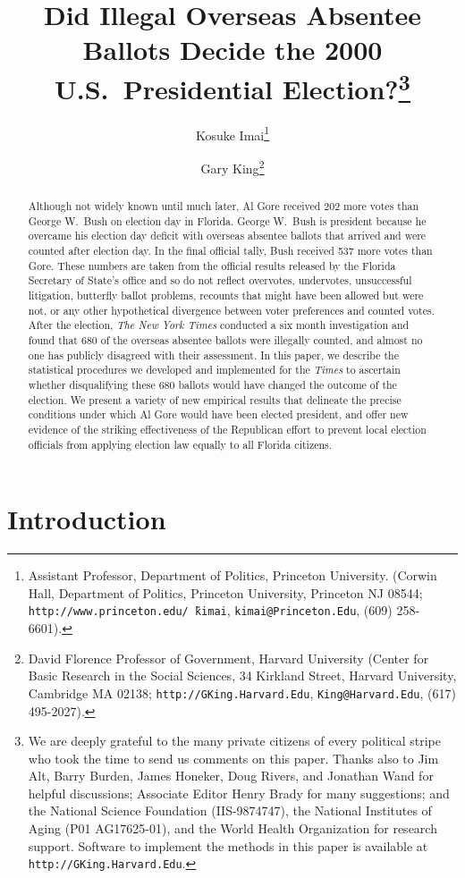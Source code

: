 \documentclass[11pt,titlepage]{article}
\title{Did Illegal Overseas Absentee Ballots Decide the 2000 U.S.\ 
  Presidential Election?\thanks{We are deeply grateful to the many
    private citizens of every political stripe who took the time to
    send us comments on this paper.  Thanks also to Jim Alt, Barry
    Burden, James Honeker, Doug Rivers, and Jonathan Wand for helpful
    discussions; Associate Editor Henry Brady for many suggestions;
    and the National Science Foundation (IIS-9874747), the National
    Institutes of Aging (P01 AG17625-01), and the World Health
    Organization for research support.  Software to implement the
    methods in this paper is available at
    \texttt{http://GKing.Harvard.Edu}.}}
\author{Kosuke Imai\thanks{Assistant Professor, Department of
    Politics, Princeton University. (Corwin Hall, Department of
    Politics, Princeton University, Princeton NJ 08544;
    \texttt{http://www.princeton.edu/\~\,kimai},
    \texttt{kimai@Princeton.Edu}, (609) 258-6601).}
\and %
Gary King\thanks{David Florence Professor of Government, Harvard
  University (Center for Basic Research in the Social Sciences, 34
  Kirkland Street, Harvard University, Cambridge MA 02138;
  \texttt{http://GKing.Harvard.Edu}, \texttt{King@Harvard.Edu}, (617)
  495-2027).}  }
\begin{document}
\maketitle
{}\baselineskip

\begin{abstract}
  Although not widely known until much later, Al Gore received 202
  more votes than George W.\ Bush on election day in Florida.  George
  W.\ Bush is president because he overcame his election day deficit
  with overseas absentee ballots that arrived and were counted after
  election day.  In the final official tally, Bush received 537 more
  votes than Gore.  These numbers are taken from the official results
  released by the Florida Secretary of State's office and so do not
  reflect overvotes, undervotes, unsuccessful litigation, butterfly
  ballot problems, recounts that might have been allowed but were not,
  or any other hypothetical divergence between voter preferences and
  counted votes.  After the election, \emph{The New York Times}
  conducted a six month investigation and found that 680 of the
  overseas absentee ballots were illegally counted, and almost no one
  has publicly disagreed with their assessment.  In this paper, we
  describe the statistical procedures we developed and implemented for
  the \emph{Times} to ascertain whether disqualifying these 680
  ballots would have changed the outcome of the election.  We present
  a variety of new empirical results that delineate the precise
  conditions under which Al Gore would have been elected president,
  and offer new evidence of the striking effectiveness of the
  Republican effort to prevent local election officials from applying
  election law equally to all Florida citizens.
\end{abstract}


\section{Introduction}
\end{document}
